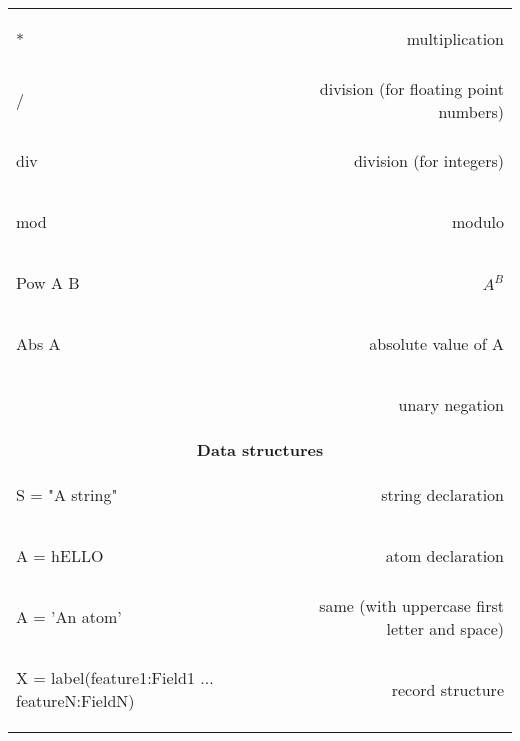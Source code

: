 \documentclass[12pt]{article}
\begin{document}
\begin{longtable}{l r}
\begin{oz}
*
\end{oz}
&multiplication\\
 
\begin{oz}
/
\end{oz}
&division (for floating point numbers)\\
 
\begin{oz}
div
\end{oz}
&division (for integers)\\
 
\begin{oz}
mod
\end{oz}
&modulo\\
 
\begin{oz}
{Pow A B}
\end{oz}
&$A^{B}$\\
 
\begin{oz}
{Abs A}
\end{oz}
&absolute value of A\\

\begin{oz}
~
\end{oz}
&unary negation\\[0.4em]
 


\multicolumn{2}{c}{\textbf{Data structures}}\\

\begin{oz}
S = "A string"
\end{oz}
& string declaration\\

\begin{oz}
A = hELLO
\end{oz}
& atom declaration\\

\begin{oz}
A = 'An atom'
\end{oz}
& same (with uppercase first letter and space)\\



\begin{oz}
X = label(feature1:Field1 
		... 
	  featureN:FieldN)
\end{oz}
&record structure \\


\end{longtable}
\end{document}
